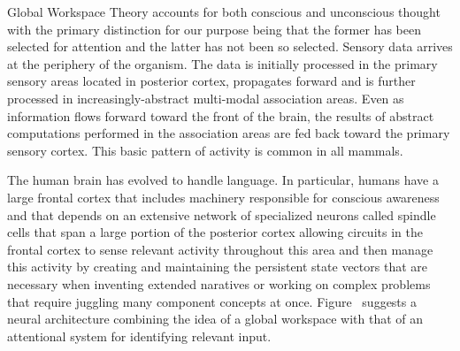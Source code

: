Global Workspace Theory accounts for both conscious and unconscious thought with the primary distinction for our purpose being that the former has been selected for attention and the latter has not been so selected. Sensory data arrives at the periphery of the organism. The data is initially processed in the primary sensory areas located in posterior cortex, propagates forward and is further processed in increasingly-abstract multi-modal association areas. Even as information flows forward toward the front of the brain, the results of abstract computations performed in the association areas are fed back toward the primary sensory cortex. This basic pattern of activity is common in all mammals. 

The human brain has evolved to handle language. In particular, humans have a large frontal cortex that includes machinery responsible for conscious awareness and that depends on an extensive network of specialized neurons called spindle cells that span a large portion of the posterior cortex allowing circuits in the frontal cortex to sense relevant activity throughout this area and then manage this activity by creating and maintaining the persistent state vectors that are necessary when inventing extended naratives or working on complex problems that require juggling many component concepts at once. Figure~{} suggests a neural architecture combining the idea of a global workspace with that of an attentional system for identifying relevant input.


\setcounter{figure}{50}


